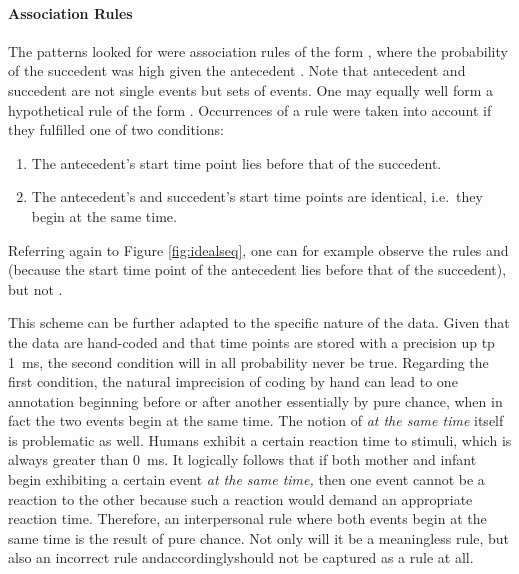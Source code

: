 \paragraph{Association Rules}
The patterns \citet{rohlfing18} looked for were association rules of the form , where the probability of the succedent  was high given the antecedent . Note that antecedent and succedent are not single events but sets of events. One may equally well form a hypothetical rule of the form . Occurrences of a rule were taken into account if they fulfilled one of two conditions:

\begin{enumerate}
	\item The antecedent's start time point lies before that of the succedent.
	\item The antecedent's and succedent's start time points are identical, i.e.\ they begin at the same time.
\end{enumerate}

Referring again to Figure \ref{fig:idealseq}, one can for example observe the rules  and  (because the start time point of the antecedent lies before that of the succedent), but not .

This scheme can be further adapted to the specific nature of the data. Given that the data are hand-coded and that time points are stored with a precision up tp 1~ms, the second condition will in all probability never be true. Regarding the first condition, the natural imprecision of coding by hand can lead to one annotation beginning before or after another essentially by pure chance, when in fact the two events begin at the same time. The notion of \emph{at the same time} itself is problematic as well. Humans exhibit a certain reaction time to stimuli, which is always greater than 0~ms. It logically follows that if both mother and infant begin exhibiting a certain event \emph{at the same time,} then one event cannot be a reaction to the other because such a reaction would demand an appropriate reaction time. Therefore, an interpersonal rule where both events begin at the same time is the result of pure chance. Not only will it be a meaningless rule, but also an incorrect rule and\dash accordingly\dash should not be captured as a rule at all.


